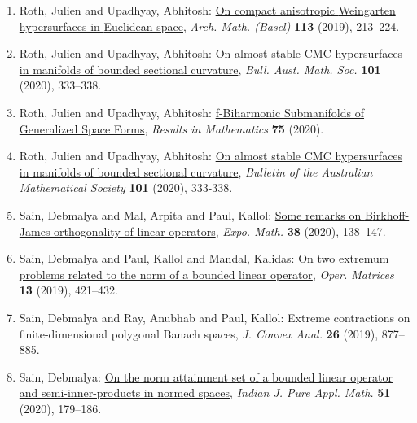 \begin{enumerate}[resume, leftmargin=27pt]
	\item Roth, Julien and Upadhyay, Abhitosh: \href{https://doi.org/10.1007/s00013-019-01315-8}{On compact anisotropic {W}eingarten hypersurfaces in
			      {E}uclidean space}, \emph{Arch. Math. (Basel)} {\bf 113} (2019), 213--224.

	\item Roth, Julien and Upadhyay, Abhitosh: \href{https://doi.org/10.1017/s0004972719000935}{On almost stable {CMC} hypersurfaces in manifolds of bounded
		      sectional curvature}, \emph{Bull. Aust. Math. Soc.} {\bf 101} (2020), 333--338.

	\item Roth, Julien and Upadhyay, Abhitosh: \href{https://link.springer.com/article/10.1007/s00025-019-1142-4?shared-article-renderer#citeas}{f-Biharmonic Submanifolds of Generalized Space Forms}, \emph{Results in Mathematics} {\bf 75} (2020).

	\item Roth, Julien and Upadhyay, Abhitosh: \href{https://www.cambridge.org/core/journals/bulletin-of-the-australian-mathematical-society/article/on-almost-stable-cmc-hypersurfaces-in-manifolds-of-bounded-sectional-curvature/E0BF84D4D46C82F6D75CDCEAAF5DEE94}{On almost stable CMC hypersurfaces in manifolds of bounded sectional curvature}, \emph{Bulletin of the Australian Mathematical Society} {\bf 101} (2020), 333-338.

	\item Sain, Debmalya and Mal, Arpita and Paul, Kallol: \href{https://doi.org/10.1016/j.exmath.2019.01.001}{Some remarks on {B}irkhoff-{J}ames orthogonality of linear
	      operators}, \emph{Expo. Math.} {\bf 38} (2020), 138--147.

	\item Sain, Debmalya and Paul, Kallol and Mandal, Kalidas: \href{https://doi.org/10.7153/oam-2019-13-31}{On two extremum problems related to the norm of a bounded
		      linear operator}, \emph{Oper. Matrices} {\bf 13} (2019), 421--432.

	\item Sain, Debmalya and Ray, Anubhab and Paul, Kallol: Extreme contractions on finite-dimensional polygonal {B}anach
	      spaces, \emph{J. Convex Anal.} {\bf 26} (2019), 877--885.

	\item Sain, Debmalya: \href{https://doi.org/10.1007/s13226-020-0393-9}{On the norm attainment set of a bounded linear
		      operator and
		      semi-inner-products in normed spaces}, \emph{Indian J. Pure Appl. Math.} {\bf 51} (2020), 179--186.


\end{enumerate}
